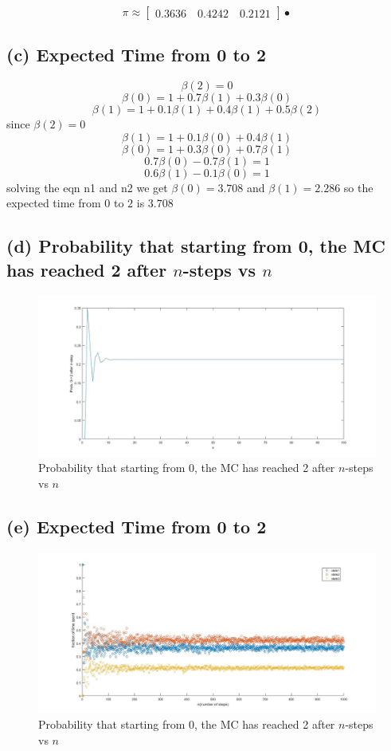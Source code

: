 \documentclass[a4paper,11pt]{article}
\begin{document}
$$
\pi \approx \begin{bmatrix}
0.3636 \quad 0.4242 \quad   0.2121
\end{bmatrix}•
$$
\subsection*{(c) Expected Time from 0 to 2}
$$\beta(2) = 0$$
$$\beta(0) = 1+0.7\beta(1) + 0.3\beta(0)$$
$$\beta(1) = 1+0.1\beta(1) +0.4\beta(1) + 0.5\beta(2) $$
since $\beta(2)=0$
$$\beta(1) = 1+0.1\beta(0) + 0.4\beta(1)$$
$$\beta(0) = 1+0.3\beta(0) + 0.7\beta(1)$$
$$0.7\beta(0)-0.7\beta(1) = 1$$
$$0.6\beta(1)-0.1\beta(0) = 1$$
solving the eqn n1 and n2 we get $\beta(0) = 3.708$ and $\beta(1)= 2.286$
so the expected time from $0$ to $2$ is $ 3.708$


\newpage

\subsection*{(d) Probability that starting from 0, the MC has reached 2 after $n$-steps  vs $ n$}
\begin{figure}[h]
        \includegraphics[scale=0.35]{2d}
        \caption{Probability that starting from 0, the MC has reached 2 after $n$-steps  vs $ n$}
\end{figure}
\newpage

\subsection*{(e) Expected Time from 0 to 2}
\begin{figure}[h]
        \includegraphics[scale=0.35]{2e}
        \caption{Probability that starting from 0, the MC has reached 2 after $n$-steps  vs $ n$}
\end{figure}
\newpage
\end{document}
